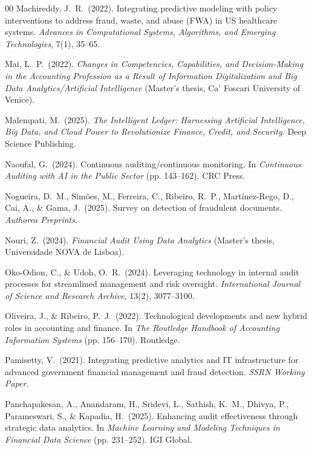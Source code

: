 \documentclass[preprint,12pt]{elsarticle}
\begin{document}
\begin{thebibliography}{00}
 Machireddy, J.\ R.\ (2022). Integrating predictive modeling with policy interventions to address fraud, waste, and abuse (FWA) in US healthcare systems. \emph{Advances in Computational Systems, Algorithms, and Emerging Technologies}, 7(1), 35--65.

 Mai, L.\ P.\ (2022). \emph{Changes in Competencies, Capabilities, and Decision-Making in the Accounting Profession as a Result of Information Digitalization and Big Data Analytics/Artificial Intelligence} (Master's thesis, Ca' Foscari University of Venice).

 Malempati, M.\ (2025). \emph{The Intelligent Ledger: Harnessing Artificial Intelligence, Big Data, and Cloud Power to Revolutionize Finance, Credit, and Security}. Deep Science Publishing.

 Naoufal, G.\ (2024). Continuous auditing/continuous monitoring. In \emph{Continuous Auditing with AI in the Public Sector} (pp. 143--162). CRC Press.

 Nogueira, D.\ M., Sim\~oes, M., Ferreira, C., Ribeiro, R.\ P., Mart\'inez-Rego, D., Cai, A., \& Gama, J.\ (2025). Survey on detection of fraudulent documents. \emph{Authorea Preprints}.

 Nouri, Z.\ (2024). \emph{Financial Audit Using Data Analytics} (Master's thesis, Universidade NOVA de Lisboa).

 Oko-Odion, C., \& Udoh, O.\ R.\ (2024). Leveraging technology in internal audit processes for streamlined management and risk oversight. \emph{International Journal of Science and Research Archive}, 13(2), 3077--3100.

 Oliveira, J., \& Ribeiro, P.\ J.\ (2022). Technological developments and new hybrid roles in accounting and finance. In \emph{The Routledge Handbook of Accounting Information Systems} (pp. 156--170). Routledge.

 Pamisetty, V.\ (2021). Integrating predictive analytics and IT infrastructure for advanced government financial management and fraud detection. \emph{SSRN Working Paper}.

 Panchapakesan, A., Anandaram, H., Sridevi, L., Sathish, K.\ M., Dhivya, P., Parameswari, S., \& Kapadia, H.\ (2025). Enhancing audit effectiveness through strategic data analytics. In \emph{Machine Learning and Modeling Techniques in Financial Data Science} (pp. 231--252). IGI Global.


\end{thebibliography}
\end{document}
